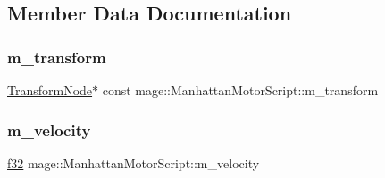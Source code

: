 \subsection{Member Data Documentation}
\hypertarget{classmage_1_1_manhattan_motor_script_a87af31ce6376830ed040b19d78da386e}{}\label{classmage_1_1_manhattan_motor_script_a87af31ce6376830ed040b19d78da386e} 
\subsubsection{\texorpdfstring{m\+\_\+transform}{m\_transform}}
{\footnotesize\ttfamily \hyperlink{structmage_1_1_transform_node}{Transform\+Node}$\ast$ const mage\+::\+Manhattan\+Motor\+Script\+::m\+\_\+transform\hspace{0.3cm}{\ttfamily [private]}}

\hypertarget{classmage_1_1_manhattan_motor_script_ae7a94b156266f2e6b70318248e9fba1f}{}\label{classmage_1_1_manhattan_motor_script_ae7a94b156266f2e6b70318248e9fba1f} 
\subsubsection{\texorpdfstring{m\+\_\+velocity}{m\_velocity}}
{\footnotesize\ttfamily \hyperlink{namespacemage_a6a44ad388483959dc4dff9f2aef91431}{f32} mage\+::\+Manhattan\+Motor\+Script\+::m\+\_\+velocity\hspace{0.3cm}{\ttfamily [private]}}

